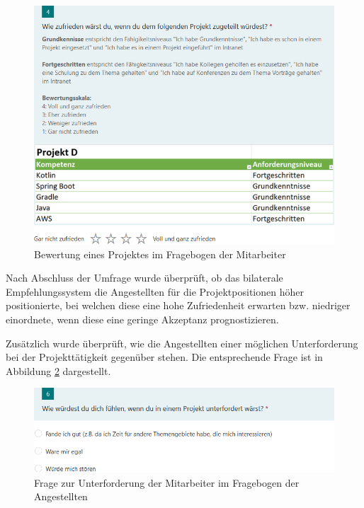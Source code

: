 \begin{figure}[h]
	\centering
	\includegraphics[width=1\textwidth]{gfx/projekt-umfrage.png}
	\caption{Bewertung eines Projektes im Fragebogen der Mitarbeiter}
	\label{fig:methodik:evaluation:abb1}
\end{figure}

Nach Abschluss der Umfrage wurde überprüft, ob das bilaterale Empfehlungssystem die Angestellten für die Projektpositionen höher positionierte, bei welchen diese eine hohe Zufriedenheit erwarten bzw. niedriger einordnete, wenn diese eine geringe Akzeptanz prognostizieren.

Zusätzlich wurde überprüft, wie die Angestellten einer möglichen Unterforderung bei der Projekttätigkeit gegenüber stehen. Die entsprechende Frage ist in Abbildung \ref{fig:methodik:evaluation:abb3} dargestellt.

\begin{figure}[h]
	\centering
	\includegraphics[width=1\textwidth]{gfx/umfrage-mitarbeiter-unterforderung.png}
	\caption{Frage zur Unterforderung der Mitarbeiter im Fragebogen der Angestellten}
	\label{fig:methodik:evaluation:abb3}
\end{figure}

